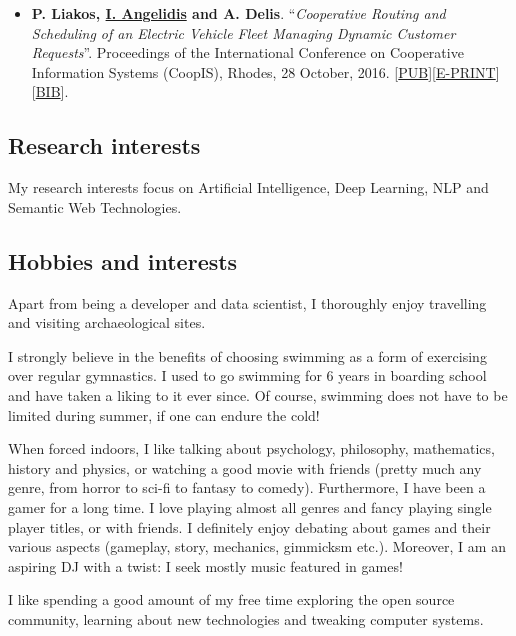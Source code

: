 \documentclass[a4paper,oneside,11pt]{article}
\begin{document}
\begin{itemize}
\item \textbf{P. Liakos, \underline{I. Angelidis} and A. Delis}. ``\textit{Cooperative Routing and Scheduling of an Electric Vehicle Fleet Managing Dynamic Customer Requests}''. Proceedings of the International Conference on Cooperative Information Systems (CoopIS), Rhodes, 28 October, 2016. [\href{https://link.springer.com/chapter/10.1007%2F978-3-319-48472-3_7}{PUB}][\href{https://iosang.github.io/documents/Publications/2016/LAD-Coopis16.pdf}{E-PRINT}][\href{https://dblp.uni-trier.de/rec/bib1/conf/otm/LiakosAD16.bib}{BIB}].

\end{itemize}

\subsection*{Research interests}

My research interests focus on Artificial Intelligence, Deep Learning, NLP and Semantic Web Technologies.

\subsection*{Hobbies and interests}

Apart from being a developer and data scientist, I thoroughly enjoy travelling and visiting archaeological sites.

I strongly believe in the benefits of choosing swimming as a form of exercising over regular gymnastics. I used to go swimming for 6 years in boarding school and have taken a liking to it ever since. Of course, swimming does not have to be limited during summer, if one can endure the cold!

When forced indoors, I like talking about psychology, philosophy, mathematics, history and physics, or watching a good movie with friends (pretty much any genre, from horror to sci-fi to fantasy to comedy). Furthermore, I have been a gamer for a long time. I love playing almost all genres and fancy playing single player titles, or with friends. I definitely enjoy debating about games and their various aspects (gameplay, story, mechanics, gimmicksm etc.). Moreover, I am an aspiring DJ with a twist: I seek mostly music featured in games!

I like spending a good amount of my free time exploring the open source community, learning about new technologies and tweaking computer systems.
\end{document}
